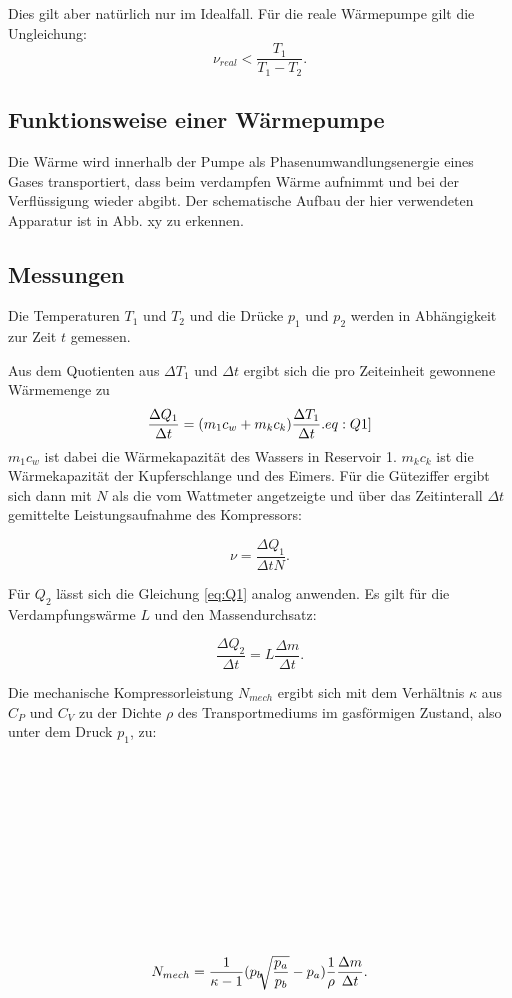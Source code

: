 Dies gilt aber natürlich nur im Idealfall. Für die reale Wärmepumpe gilt die Ungleichung: 
\begin{equation}
    \nu_{real} < \frac{T_1}{T_1-T_2}.
\end{equation}

\subsection{Funktionsweise einer Wärmepumpe}
Die Wärme wird innerhalb der Pumpe als Phasenumwandlungsenergie eines Gases transportiert, dass beim verdampfen Wärme aufnimmt und bei der Verflüssigung wieder abgibt. Der schematische Aufbau der hier verwendeten Apparatur ist in Abb. xy zu erkennen. 

\subsection{Messungen}

Die Temperaturen $T_1$ und $T_2$ und die Drücke $p_1$ und $p_2$ werden in Abhängigkeit zur Zeit $t$ gemessen. 

Aus dem Quotienten aus $\Delta T_1$ und $\Delta t$ ergibt sich die pro Zeiteinheit gewonnene Wärmemenge zu 
\begin{equation}
    \frac{\Delta Q_1}{\Delta t} = (m_1c_w + m_kc_k)\frac{\Delta T_1}{\Delta t}.
\label[eq:Q1]
\end{equation}
$m_1c_w$ ist dabei die Wärmekapazität des Wassers in Reservoir 1. $m_kc_k$ ist die Wärmekapazität der Kupferschlange und des Eimers. Für die Güteziffer ergibt sich dann mit $N$ als die vom Wattmeter angetzeigte und über das Zeitinterall $\Delta t$ gemittelte Leistungsaufnahme des Kompressors:

\begin{equation}
    \nu = \frac{\Delta Q_1}{\Delta t N}. 
\end{equation}

Für $Q_2$ lässt sich die Gleichung \ref{eq:Q1} analog anwenden. Es gilt für die Verdampfungswärme $L$ und den Massendurchsatz:

\begin{equation}
    \frac{\Delta Q_2}{\Delta t} = L \frac{\Delta m}{\Delta t}.
\end{equation}

Die mechanische Kompressorleistung $N_{mech}$ ergibt sich mit dem Verhältnis $\kappa$ aus $C_P$ und $C_V$ zu der Dichte $\rho$ des Transportmediums im gasförmigen Zustand, also unter dem Druck $p_1$, zu:

\begin{equation}
    N_{mech} = \frac{1}{\kappa - 1} (p_b \sqrt[\uproot{\kappa}]{\frac{p_a}{p_b}} - p_a)\frac{1}{\rho}\frac{\Delta m}{\Delta t}. 
\end{equation}


